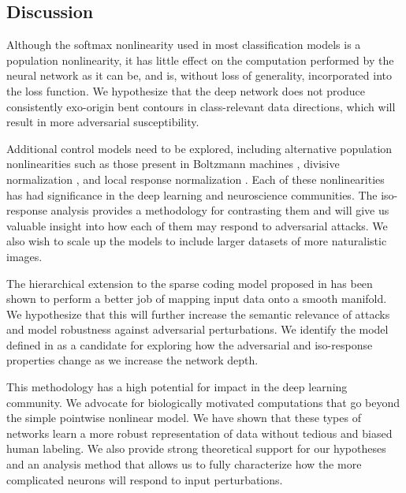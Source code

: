 \subsection{Discussion}
Although the softmax nonlinearity used in most classification models is a population nonlinearity, it has little effect on the computation performed by the neural network as it can be, and is, without loss of generality, incorporated into the loss function. We hypothesize that the deep network does not produce consistently exo-origin bent contours in class-relevant data directions, which will result in more adversarial susceptibility.

Additional control models need to be explored, including alternative population nonlinearities such as those present in Boltzmann machines \parencite{salakhutdinov2009deep}, divisive normalization \parencite{balle2016end}, and local response normalization \parencite{krizhevsky2012imagenet}. Each of these nonlinearities has had significance in the deep learning and neuroscience communities. The iso-response analysis provides a methodology for contrasting them and will give us valuable insight into how each of them may respond to adversarial attacks. We also wish to scale up the models to include larger datasets of more naturalistic images. 

The hierarchical extension to the sparse coding model proposed in \parencite{chen2018sparse} has been shown to perform a better job of mapping input data onto a smooth manifold. We hypothesize that this will further increase the semantic relevance of attacks and model robustness against adversarial perturbations. We identify the model defined in \parencite{chen2018sparse} as a candidate for exploring how the adversarial and iso-response properties change as we increase the network depth.

This methodology has a high potential for impact in the deep learning community. We advocate for biologically motivated computations that go beyond the simple pointwise nonlinear model. We have shown that these types of networks learn a more robust representation of data without tedious and biased human labeling. We also provide strong theoretical support for our hypotheses and an analysis method that allows us to fully characterize how the more complicated neurons will respond to input perturbations.

